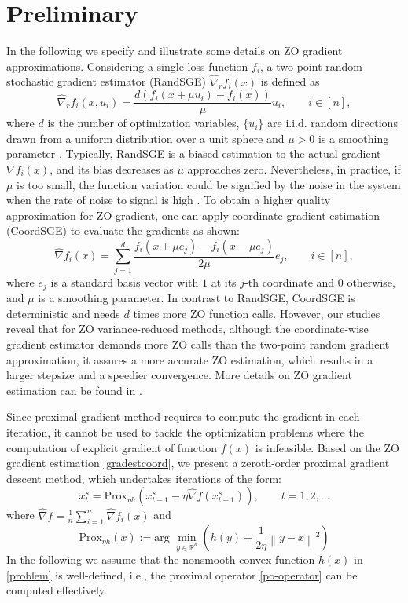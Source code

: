 \documentclass{article}
\newcommand*{\R}{\mathbb{R}}
\newcommand*{\Po}{\text{Prox}}
\newcommand{\norm}[1]{\left\lVert#1\right\rVert}
\theoremstyle{definition}
\theoremstyle{remark}
\begin{document}
\section{Preliminary}
In the following we specify and illustrate some details on ZO gradient approximations.
Considering a single loss function $f_i$, a two-point random stochastic gradient estimator (RandSGE) $\hat{\nabla}_r f_i(x)$ is defined as \cite{nesterov2017random,gao2018information}
\begin{equation}\label{gradestrand}
\hat{\nabla}_r f_i(x, u_i) = \frac{d(f_i(x+\mu u_i) - f_i(x))}{\mu}u_i,\qquad i\in [n],
\end{equation}
where $d$ is the number of optimization variables, $\{u_i\}$ are i.i.d. random directions drawn from a uniform distribution over a unit sphere and $\mu > 0$ is a smoothing parameter  \cite{flaxman2005online,shamir2017optimal,gao2018information}. Typically, RandSGE is a biased estimation to the actual gradient $\nabla f_i(x)$, and its bias decreases as $\mu$ approaches zero. Nevertheless, in practice, if $\mu$ is too small, the function variation
could be signified by the noise in the system when the rate of noise to signal is high  
 \cite{lian2016comprehensive}.
To obtain a higher quality approximation for ZO gradient, one can apply coordinate gradient estimation (CoordSGE) \cite{gu2018inexact,gu2018faster,liu2018zeroth} to evaluate the gradients as shown:
\begin{equation}\label{gradestcoord}
\hat{\nabla} f_i(x) = \sum_{j=1}^d \frac{f_i(x+\mu e_j) - f_i(x-\mu e_j)}{2\mu}e_j,\qquad i\in [n],
\end{equation}
where $e_j$ is a standard basis vector with $1$ at its $j$-th coordinate and $0$ otherwise, and $\mu$ is a smoothing parameter. In contrast to RandSGE, CoordSGE is deterministic and needs $d$ times more ZO function calls. 
However, our studies reveal that for ZO variance-reduced
methods, although the coordinate-wise gradient estimator
demands more ZO calls than the two-point random gradient approximation,
it assures a more accurate ZO estimation, which results in a
larger stepsize and a speedier convergence. More details on ZO gradient estimation can be found in \cite{kazemi2018proximal}.

Since proximal gradient method requires to compute the gradient  in each iteration, it cannot be used to tackle the optimization problems where the computation of explicit gradient of function $f(x)$ is infeasible.
Based on the ZO gradient estimation \eqref{gradestcoord}, we present a zeroth-order proximal gradient descent method, which undertakes iterations of the form:
\begin{equation}
x_{t}^s= \Po_{\eta h}(x_{t-1}^s - \eta \hat{\nabla} f(x_{t-1}^s)),\qquad t=1, 2, \ldots
\end{equation}
where $\hat{\nabla} f=\frac{1}{n}\sum_{i=1}^n \hat{\nabla} f_i(x)$ and 
\begin{equation}\label{po-operator}
\Po_{\eta h}(x) := \text{arg}\,\,\min_{y\in\R^d}\left(h(y)+\frac{1}{2\eta}\norm{y-x}^2\right)
\end{equation}
In the following we assume that the
nonsmooth convex function $h(x)$ in \eqref{problem} is well-defined, i.e., the proximal operator \eqref{po-operator} can be computed effectively.
\end{document}
